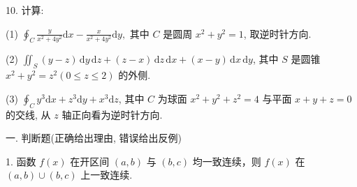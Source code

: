\documentclass{examcollection}
\begin{document}
{\begin{minipage}{\textwidth}
10. 计算:\par
(1) $\oint_{C} \frac{y}{x^{2} + 4y^{2}} \mathrm{d}x - \frac{x}{x^{2} + 4y^{2}} \mathrm{d}y,$ 其中 $C$ 是圆周 $x^{2} + y^{2} = 1$, 取逆时针方向.\par
(2) $\iint_{S} (y - z) \, \mathrm{d}y \, \mathrm{d}z + (z - x) \, \mathrm{d}z \, \mathrm{d}x + (x - y) \, \mathrm{d}x \, \mathrm{d}y$, 其中 $S$ 是圆锥 $x^2 + y^2 = z^2 (0 \leq z \leq 2)$ 的外侧.\par
(3) $\oint_{C} y^{3} \mathrm{d}x + z^{3} \mathrm{d}y + x^{3} \mathrm{d}z$, 其中 $C$ 为球面 $x^{2} + y^{2} + z^{2} = 4$ 与平面 $x + y + z = 0$ 的交线, 从 $z$ 轴正向看为逆时针方向.\par
{}\smallskip
一. 判断题(正确给出理由, 错误给出反例)\par
1. 函数 $f(x)$ 在开区间 $(a, b)$ 与 $(b, c)$ 均一致连续，则 $f(x)$ 在 $(a, b) \cup (b, c)$ 上一致连续.\par
\end{minipage}}
\ifdim\dimexpr\ht\proofbox+\dp\proofbox\relax>\textheight
\noindent\resizebox{!}{\textheight}{\usebox{\proofbox}}\else\noindent\usebox{\proofbox}\fi\clearpage
\end{document}
